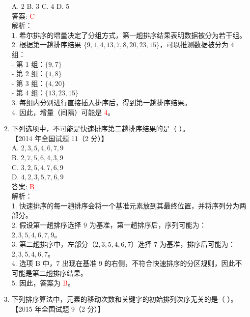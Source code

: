 \documentclass[lang=cn,newtx,10pt,scheme=chinese]{../../../elegantbook}
\begin{document}
\begin{enumerate}
    A. 2 \quad B. 3 \quad C. 4 \quad D. 5 \\

    答案: \textcolor{red}{C} \\

    解析：\\
    1. 希尔排序的增量决定了分组方式，第一趟排序结果表明数据被分为若干组。\\
    2. 根据第一趟排序结果 $\{9, 1, 4, 13, 7, 8, 20, 23, 15\}$，可以推测数据被分为 4 组：\\
       - 第 1 组：$\{9, 7\}$\\
       - 第 2 组：$\{1, 8\}$\\
       - 第 3 组：$\{4, 20\}$\\
       - 第 4 组：$\{13, 23, 15\}$\\
    3. 每组内分别进行直接插入排序后，得到第一趟排序结果。\\
    4. 因此，增量（间隔）可能是 \textcolor{red}{4}。\\
    \item 下列选项中，不可能是快速排序第二趟排序结果的是（ ）。\\
    【2014 年全国试题 11（2 分）】\\

    A. $2, 3, 5, 4, 6, 7, 9$ \\  
    B. $2, 7, 5, 6, 4, 3, 9$ \\  
    C. $3, 2, 5, 4, 7, 6, 9$ \\  
    D. $4, 2, 3, 5, 7, 6, 9$ \\

    答案: \textcolor{red}{B} \\

    解析：\\
    1. 快速排序的每一趟排序会将一个基准元素放到其最终位置，并将序列分为两部分。\\
    2. 假设第一趟排序选择 $9$ 为基准，第一趟排序后，序列可能为：$2, 3, 5, 4, 6, 7, 9$。\\
    3. 第二趟排序中，左部分（$2, 3, 5, 4, 6, 7$）选择 $7$ 为基准，排序后可能为：$2, 3, 5, 4, 6, 7$。\\
    4. 选项 B 中，$7$ 出现在基准 $9$ 的右侧，不符合快速排序的分区规则，因此不可能是第二趟排序结果。\\
    5. 因此，答案为 \textcolor{red}{B}。\\

    \item 下列排序算法中，元素的移动次数和关键字的初始排列次序无关的是（ ）。\\
    【2015 年全国试题 9（2 分）】\\


\end{enumerate}
\end{document}
